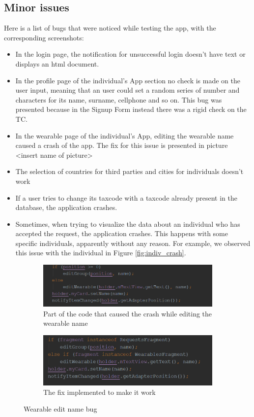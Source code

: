 \subsection{Minor issues}
Here is a list of bugs that were noticed while testing the app, with the corresponding screenshots:
\begin{itemize}
\item[] In the login page, the notification for unsuccessful login doesn't have text or displays an html document.
\item[] In the profile page of the individual's App section no check is made on the user input, meaning that an user could set a random series of number and characters for its name, surname, cellphone and so on. This bug was presented because in the Signup Form instead there was a rigid check on the TC.
\item[] In the wearable page of the individual's App, editing the wearable name caused a crash of the app. The fix for this issue is presented in picture <insert name of picture>
\item[] The selection of countries for third parties and cities for individuals doesn't work
\item[] If a user tries to change its taxcode with a taxcode already present in the database, the application  crashes.
\item[] Sometimes, when trying to visualize the data about an individual who has accepted the request, the application crashes. This happens with some specific individuals, apparently without any reason. For example, we observed this issue with the individual in Figure \ref{fig:indiv_crash}.
\end{itemize}


\begin{figure}
\centering
\begin{subfigure}{.5\textwidth}
  \centering
   \includegraphics[scale=0.6]{resources/bugwearablwe.png}
   \caption{Part of the code that caused the crash while editing the wearable name}
  \label{fig:sub1}
\end{subfigure}%
\begin{subfigure}{.5\textwidth}
  \centering
   \includegraphics[scale=0.6]{resources/bugfixed.png}
   \caption{The fix implemented to make it work}
  \label{fig:sub2}
\end{subfigure}
\caption{Wearable edit name bug}
\label{fig:test}
\end{figure}


